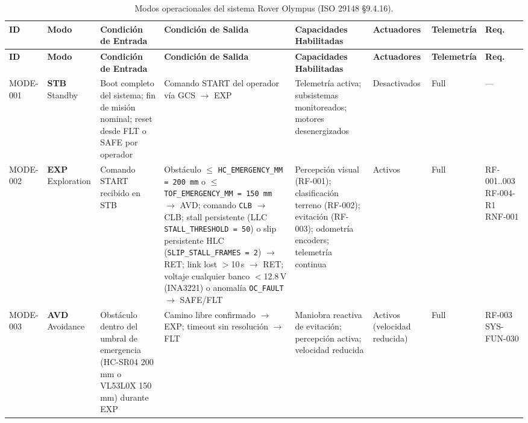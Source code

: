 \begin{landscape}
\centering
\scriptsize
\setlength{\tabcolsep}{3pt}
\renewcommand{\arraystretch}{1.4}
\begin{longtable}{| l | l | p{3.0cm} | p{2.8cm} | p{3.0cm} | p{2.5cm} | p{1.6cm} | p{2.5cm} |}
\caption{Modos operacionales del sistema Rover Olympus (ISO 29148 §9.4.16).}\label{tab:op_modes}\\
\hline
\textbf{ID} & \textbf{Modo} & \textbf{Condición de Entrada} & \textbf{Condición de Salida} & \textbf{Capacidades Habilitadas} & \textbf{Actuadores} & \textbf{Telemetría} & \textbf{Req.} \\ \hline
\endfirsthead
\hline
\textbf{ID} & \textbf{Modo} & \textbf{Condición de Entrada} & \textbf{Condición de Salida} & \textbf{Capacidades Habilitadas} & \textbf{Actuadores} & \textbf{Telemetría} & \textbf{Req.} \\ \hline
\endhead
\hline
\endfoot
\hline
\endlastfoot

MODE-001 & \textbf{STB} \newline Standby &
Boot completo del sistema; fin de misión nominal; reset desde FLT o SAFE por operador &
Comando START del operador vía GCS $\rightarrow$ EXP &
Telemetría activa; subsistemas monitoreados; motores desenergizados &
Desactivados &
Full &
--- \\ \hline

MODE-002 & \textbf{EXP} \newline Exploration &
Comando START recibido en STB &
Obstáculo $\le$ \texttt{HC\_EMERGENCY\_MM = 200\,mm} o $\le$ \texttt{TOF\_EMERGENCY\_MM = 150\,mm} $\rightarrow$ AVD; comando \texttt{CLB} $\rightarrow$ CLB; stall persistente (LLC \texttt{STALL\_THRESHOLD = 50}) o slip persistente HLC (\texttt{SLIP\_STALL\_FRAMES = 2}) $\rightarrow$ RET; link lost $>$10\,s $\rightarrow$ RET; voltaje cualquier banco $<$12.8\,V (INA3221) o anomalía \texttt{OC\_FAULT} $\rightarrow$ SAFE/FLT &
Percepción visual (RF-001); clasificación terreno (RF-002); evitación (RF-003); odometría encoders; telemetría continua &
Activos &
Full &
RF-001..003 \newline RF-004-R1 \newline RNF-001 \\ \hline

MODE-003 & \textbf{AVD} \newline Avoidance &
Obstáculo dentro del umbral de emergencia (HC-SR04 200\,mm o VL53L0X 150\,mm) durante EXP &
Camino libre confirmado $\rightarrow$ EXP; timeout sin resolución $\rightarrow$ FLT &
Maniobra reactiva de evitación; percepción activa; velocidad reducida &
Activos \newline (velocidad reducida) &
Full &
RF-003 \newline SYS-FUN-030 \\ \hline


\end{longtable}
\end{landscape}
